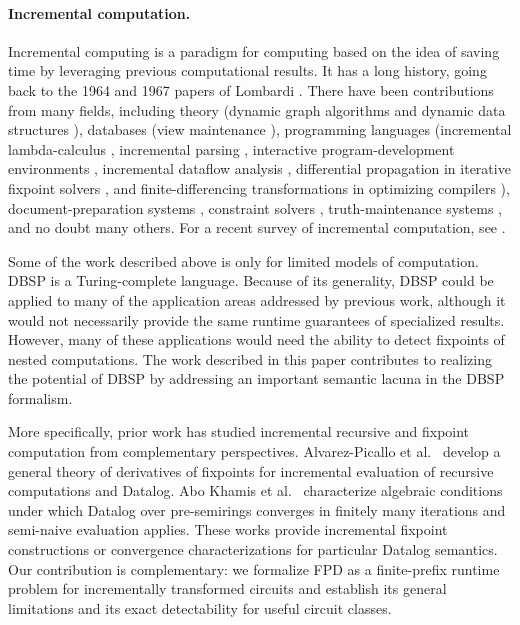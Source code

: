 \paragraph{Incremental computation.}
Incremental computing is a paradigm for computing based on the idea of saving time by leveraging previous computational results.
It has a long history, going back to the 1964 and 1967 papers of Lombardi \cite{LISP:LR64,AIC:Lombardi67}.
There have been contributions from many fields, including theory
(dynamic graph algorithms \cite{ausiello1990dynamic,ramalingam1996incremental} and dynamic data structures \cite{bentley1980decomposable,leeuwen1980dynamization}), databases (view maintenance \cite{Book:GM99,chirkova2012materialized}), programming languages (incremental lambda-calculus \cite{field1990incremental}, incremental parsing \cite{ghezzi1979incremental}, interactive program-development environments \cite{reps1983incremental}, incremental dataflow analysis \cite{ryder1988incremental}, differential propagation in iterative fixpoint solvers \cite{fecht1998propagating}, and finite-differencing transformations in optimizing compilers \cite{paige1982finite}), document-preparation systems \cite{chen2000incremental}, constraint solvers \cite{freeman1990incremental}, truth-maintenance systems \cite{doyle1979truth}, and no doubt many others.
For a recent survey of incremental computation, see \cite{DBLP:conf/pepm/Liu24}.

Some of the work described above is only for limited models of computation.
DBSP is a Turing-complete language.
Because of its generality, DBSP could be applied to many of the application areas addressed by previous work, although it would not necessarily provide the same runtime guarantees of specialized results.
However, many of these applications would need the ability to detect fixpoints of nested computations.
The work described in this paper contributes to realizing the potential of DBSP by addressing an important semantic lacuna in the DBSP formalism.

More specifically, prior work has studied incremental recursive and fixpoint computation from complementary perspectives. Alvarez-Picallo et al.~\cite{AlvarezPicallo2019Fixing} develop a general theory of derivatives of fixpoints for incremental evaluation of recursive computations and Datalog. Abo Khamis et al.~\cite{AboKhamis2024Convergence} characterize algebraic conditions under which Datalog over pre-semirings converges in finitely many iterations and semi-naive evaluation applies. These works provide incremental fixpoint constructions or convergence characterizations for particular Datalog semantics. Our contribution is complementary: we formalize FPD as a finite-prefix runtime problem for incrementally transformed circuits and establish its general limitations and its exact detectability for useful circuit classes.

